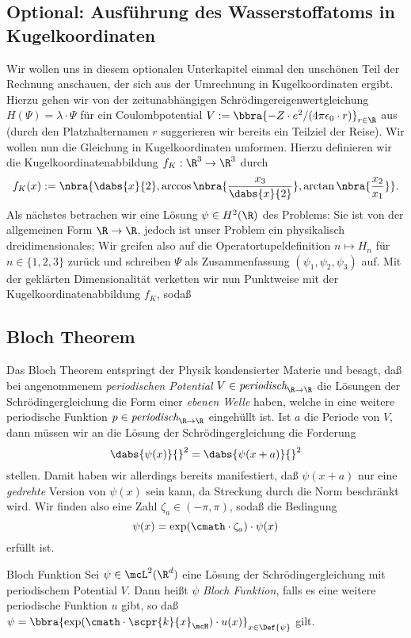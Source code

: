 \documentclass{subfiles}
\begin{document}
    \subsection*{Optional: Ausführung des Wasserstoffatoms in Kugelkoordinaten}
        Wir wollen uns in diesem optionalen Unterkapitel einmal den unschönen Teil der Rechnung anschauen, der sich aus der Umrechnung in Kugelkoordinaten ergibt. Hierzu gehen wir von der zeitunabhängigen Schrödingereigenwertgleichung $H(\Psi) = \lambda\cdot\Psi$ für ein Coulombpotential $V := \bbra{-Z\cdot e^2/(4\pi\epsilon_0\cdot r)}_{r\in\R}$ aus (durch den Platzhalternamen $r$ suggerieren wir bereits ein Teilziel der Reise). Wir wollen nun die Gleichung in Kugelkoordinaten umformen. Hierzu definieren wir die Kugelkoordinatenabbildung $f_K:\R^3\to\R^3$ durch 
        \[
            f_K(x) := \nbra{\dabs{x}{2},\arccos\nbra{\frac{x_3}{\dabs{x}{2}}},\arctan\nbra{\frac{x_2}{x_1}}}.
        \]
        Als nächstes betrachen wir eine Lösung $\psi\in H^2(\R)$ des Problems: Sie ist von der allgemeinen Form $\R\to\R$, jedoch ist unser Problem ein physikalisch dreidimensionales; Wir greifen also auf die Operatortupeldefinition $n\mapsto H_n$ für $n\in\{1,2,3\}$ zurück und schreiben $\Psi$ als Zusammenfassung $(\psi_1,\psi_2,\psi_3)$ auf. Mit der geklärten Dimensionalität verketten wir nun Punktweise mit der Kugelkoordinatenabbildung $f_K$, sodaß 


        
        
    \subsection*{Bloch Theorem}
        Das Bloch Theorem entspringt der Physik kondensierter Materie und besagt, daß bei angenommenem \emph{periodischen Potential} $V\in\textit{periodisch}_{\R\to\R}$ die Lösungen der Schrödingergleichung die Form einer \emph{ebenen Welle} haben, welche in eine weitere periodische Funktion $p\in\textit{periodisch}_{\R\to\R}$ eingehüllt ist. Ist $a$ die Periode von $V$, dann müssen wir an die Lösung der Schrödingergleichung die Forderung
        \[\dabs{\psi(x)}{}^2 = \dabs{\psi(x + a)}{}^2\]
        stellen. Damit haben wir allerdings bereits manifestiert, daß $\psi(x + a)$ nur eine \emph{gedrehte} Version von $\psi(x)$ sein kann, da Streckung durch die Norm beschränkt wird. Wir finden also eine Zahl $\zeta_a\in(-\pi,\pi)$, sodaß die Bedingung
        \[\psi(x) = \exp(\cmath\cdot\zeta_a)\cdot\psi(x)\]
        erfüllt ist. 
        \begin{mdef}{Bloch Funktion}
            Sei $\psi\in\mcL^2(\R^d)$ eine Lösung der Schrödingergleichung mit periodischem Potential $V$. Dann heißt $\psi$ \emph{Bloch Funktion}, falls es eine weitere periodische Funktion $u$ gibt, so daß $\psi = \bbra{\exp(\cmath\cdot\scpr{k}{x}_\mcH)\cdot u(x)}_{x\in\Def{\psi}}$ gilt.
        \end{mdef}
        
        
\end{document}
